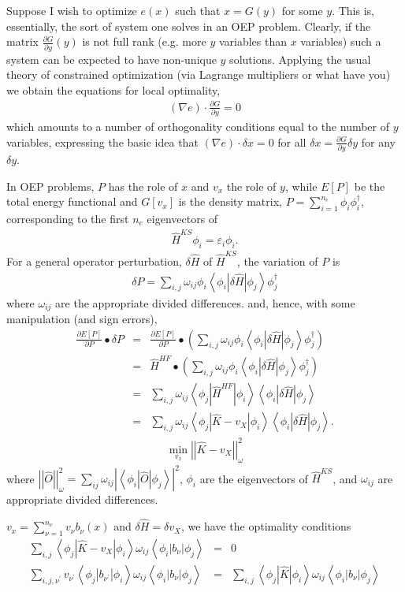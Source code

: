 \documentclass{article}
\newcommand{\beas}{\begin{eqnarray*}}
\newcommand{\enas}{\end{eqnarray*}}
\newcommand{\paren}[1]{\left({#1}\right)}
\newcommand{\norm}[1]{\left|\left|{#1}\right|\right|}
\newcommand{\inp}[1]{\left<{#1}\right>}
\begin{document}
Suppose I wish to optimize $e(x)$ such that $x = G(y)$ for some $y$.
This is, essentially, the sort of system one solves in an OEP problem.
Clearly, if the matrix
$\frac{\partial G}{\partial y}(y)$ is not full rank (e.g.
more $y$ variables than $x$ variables) such a system can be expected
to have non-unique $y$ solutions.  Applying the usual theory of
constrained optimization (via Lagrange multipliers or what have you)
we obtain the equations for local optimality,
\beas
(\nabla e) \cdot \frac{\partial G}{\partial y} = 0
\enas
which amounts to a number of orthogonality conditions equal to the
number of $y$ variables, expressing the basic idea that
$(\nabla e) \cdot \delta x = 0$ for all
$\delta x = \frac{\partial G}{\partial y} \delta y$ for any $\delta y$.

In OEP problems, $P$ has the role of $x$ and $v_x$ the role of $y$,
while $E[P]$ be the total energy functional and
$G[v_x]$ is the density matrix,
$P = \sum_{i=1}^{n_e} \phi_i \phi_i^\dagger$,
corresponding to the first $n_e$ eigenvectors of
\beas
\hat{H}^{KS} \phi_i = \varepsilon_i \phi_i.
\enas
For a general operator perturbation, $\delta \hat{H}$ of $\hat{H}^{KS}$,
the variation of $P$ is
\beas
\delta P =
 \sum_{i,j} \omega_{ij} \phi_i
 \inp{\phi_i \left|\delta \hat{H}\right| \phi_j}
 \phi_j^\dagger
\enas
where $\omega_{ij}$ are the appropriate divided differences.
and, hence, with some manipulation (and sign errors),
\beas
\frac{\partial E[P]}{\partial P} \bullet \delta P
 &=&
 \frac{\partial E[P]}{\partial P}
 \bullet
 \paren{
 \sum_{i,j} 
 \omega_{ij}\phi_i \inp{\phi_i \left|\delta \hat{H}\right| \phi_j}
 \phi_j^\dagger
 }\\
 &=&
 \hat{H}^{HF}
 \bullet
 \paren{
 \sum_{i,j} 
 \omega_{ij} \phi_i \inp{\phi_i \left|\delta \hat{H}\right| \phi_j}
 \phi_j^\dagger
 }\\
 &=&
 \sum_{i,j}
 \omega_{ij}
 \inp{\phi_j \left|\hat{H}^{HF}\right| \phi_i}
 \inp{\phi_i \left|\delta \hat{H}\right| \phi_j}
 \\
 &=&
 \sum_{i,j}
 \omega_{ij}
 \inp{\phi_j \left|\hat{K} - v_X\right| \phi_i}
 \inp{\phi_i \left|\delta \hat{H}\right| \phi_j}.
\enas
\beas
\min_{v_x} \norm{ \hat{K} - v_X }^2_{\omega}
\enas
where $\norm{ \hat{O} }^2_\omega =
 \sum_{ij} \omega_{ij} 
           \left| \inp{ \phi_i \left| \hat{O} \right| \phi_j} \right|^2$,
$\phi_i$ are the eigenvectors of $\hat{H}^{KS}$, and
$\omega_{ij}$ are appropriate divided differences.

$v_x = \sum_{\nu=1}^{n_\nu} v_\nu b_\nu(x)$
and $\delta \hat{H} = \delta v_X$, we have the optimality
conditions
\beas
 \sum_{i,j}
 \inp{\phi_j \left|\hat{K} - v_X\right| \phi_i}
 \omega_{ij}
 \inp{\phi_i \left|b_\nu \right| \phi_j}
  &=& 0\\
 \sum_{i,j,\nu^\prime}
 v_{\nu^\prime}
 \inp{\phi_j \left|b_{\nu^\prime}\right| \phi_i}
 \omega_{ij}
 \inp{\phi_i \left|b_\nu \right| \phi_j}
 &=&
 \sum_{i,j}
 \inp{\phi_j \left|\hat{K}\right| \phi_i}
 \omega_{ij}
 \inp{\phi_i \left|b_\nu \right| \phi_j}
\enas
\end{document}
